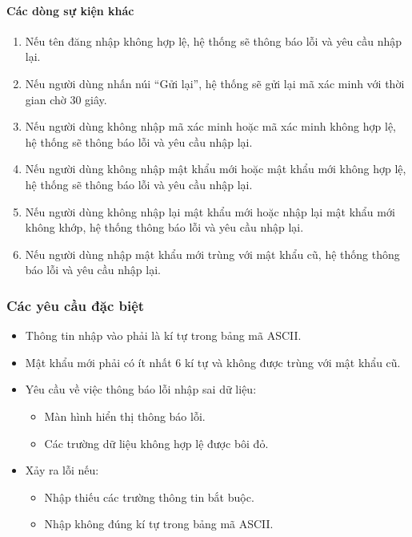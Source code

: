 \paragraph{\textbf{Các dòng sự kiện khác}}
\begin{enumerate}
    \item Nếu tên đăng nhập không hợp lệ, hệ thống sẽ thông báo lỗi và yêu cầu nhập lại.
    \item Nếu người dùng nhấn núi ``Gửi lại'', hệ thống sẽ gửi lại mã xác minh với thời gian chờ 30 giây.
    \item Nếu người dùng không nhập mã xác minh hoặc mã xác minh không hợp lệ, hệ thống sẽ thông báo lỗi và yêu cầu nhập lại.
    \item Nếu người dùng không nhập mật khẩu mới hoặc mật khẩu mới không hợp lệ, hệ thống sẽ thông báo lỗi và yêu cầu nhập lại.
    \item Nếu người dùng không nhập lại mật khẩu mới hoặc nhập lại mật khẩu mới không khớp, hệ thống thông báo lỗi và yêu cầu nhập lại.
    \item Nếu người dùng nhập mật khẩu mới trùng với mật khẩu cũ, hệ thống thông báo lỗi và yêu cầu nhập lại.
\end{enumerate}

\subsubsection{Các yêu cầu đặc biệt}
\begin{itemize}
    \item Thông tin nhập vào phải là kí tự trong bảng mã ASCII.
    \item Mật khẩu mới phải có ít nhất 6 kí tự và không được trùng với mật khẩu cũ.
    \item Yêu cầu về việc thông báo lỗi nhập sai dữ liệu:
    \begin{itemize}
        \item Màn hình hiển thị thông báo lỗi.
        \item Các trường dữ liệu không hợp lệ được bôi đỏ.
    \end{itemize}
    \item Xảy ra lỗi nếu:
    \begin{itemize}
        \item Nhập thiếu các trường thông tin bắt buộc.
        \item Nhập không đúng kí tự trong bảng mã ASCII.
    \end{itemize}
\end{itemize}

